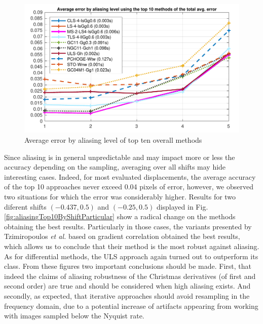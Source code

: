 \begin{figure}[htpb]
\centering
\includegraphics[width=.75\textwidth]{img/tableAliasingTop10ByLevel}
\caption{Average error by aliasing level of top ten overall methods}
\label{fig:aliasingTop10ByLevel}
\end{figure}

Since aliasing is in general unpredictable and may impact more or less the accuracy depending on the sampling, 
averaging over all shifts may hide interesting cases. Indeed, for most evaluated displacements, the average accuracy of the top 10 approaches never exceed 0.04 pixels of error, however, we observed two situations for which the error was considerably higher. Results for two diferent shifts $(-0.437, 0.5)$ and $(-0.25, 0.5)$ displayed in Fig. \ref{fig:aliasingTop10ByShiftParticular} show a radical change on the methods obtaining the best results. Particularly in those cases, the variants presented by Tzimiropoulos \emph{et al.} \cite{Tzimiropoulos2011} based on gradient correlation obtained the best results, which allows us to conclude that their method is the most robust against aliasing. As for differential methods, the ULS approach again turned out to outperform its class. From these figures two important conclusions should be made. First, that indeed the claims of aliasing robustness of the Christmas derivatives (of first and second order) are true and should be considered when high aliasing exists. And secondly, as expected, that iterative approaches should avoid resampling in the frequency domain, due to a potential increase of artifacts appearing from working with images sampled below the Nyquist rate.

